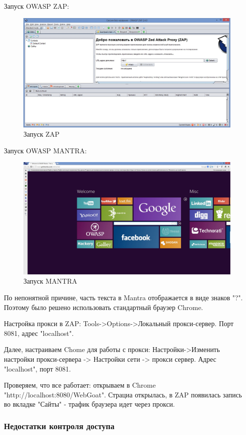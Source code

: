 \documentclass[10pt,a4paper]{article}
\begin{document}
Запуск OWASP ZAP:
\begin{figure}[h!]
\centering
\includegraphics[scale=0.34]{Zap.jpg}
\caption{Запуск ZAP}
\end{figure}

Запуск OWASP MANTRA:
\begin{figure}[h!]
\centering
\includegraphics[scale=0.25]{Mantra.jpg}
\caption{Запуск MANTRA}
\end{figure}

По непонятной причине, часть текста в Mantra отображается в виде знаков "?". Поэтому было решено использовать стандартный браузер Chrome.

Настройка прокси в ZAP: Tools->Options->Локальный прокси-сервер. Порт 8081, адрес "localhost".

Далее, настраиваем Chome для работы с прокси: Настройки->Изменить настройки прокси-сервера -> Настройки сети -> прокси сервер. Адрес "localhost", порт 8081.

Проверяем, что все работает: открываем в Chrome "http://localhost:8080/WebGoat". Страциа открылась, в ZAP появилась запись во вкладке "Сайты" -  трафик браузера идет через прокси.

\subsubsection{Недостатки контроля доступа}
\end{document}
